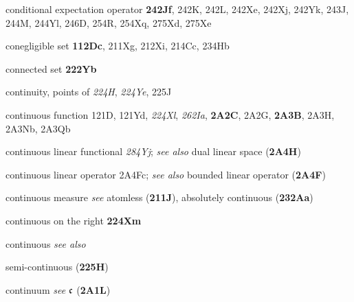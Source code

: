 conditional expectation operator {\bf 242Jf}, 242K, 242L, 242Xe,
242Xj, 242Yk, 243J, 244M, 244Yl, 246D, 254R, 254Xq, 275Xd, 275Xe










conegligible set {\bf 112Dc}, 211Xg, 212Xi, 214Cc, 234Hb

connected set {\bf 222Yb}































continuity, points of {\it 224H}, {\it 224Ye}, 225J


continuous function 121D, 121Yd,
  {\it 224Xl}, {\it 262Ia},
{\bf 2A2C}, 2A2G, {\bf 2A3B}, 2A3H, 2A3Nb, 2A3Qb





continuous linear functional {\it 284Yj};
  {\it see also} dual linear space ({\bf 2A4H})


continuous linear operator 2A4Fc; 
  {\it see also} bounded linear operator ({\bf 2A4F})


continuous measure {\it see} atomless ({\bf 211J}), absolutely
continuous ({\bf 232Aa})


continuous on the right {\bf 224Xm}





continuous {\it see also }

semi-{\vthsp}continuous ({\bf 225H})



continuum {\it see} $\frak c$ ({\bf 2A1L})









